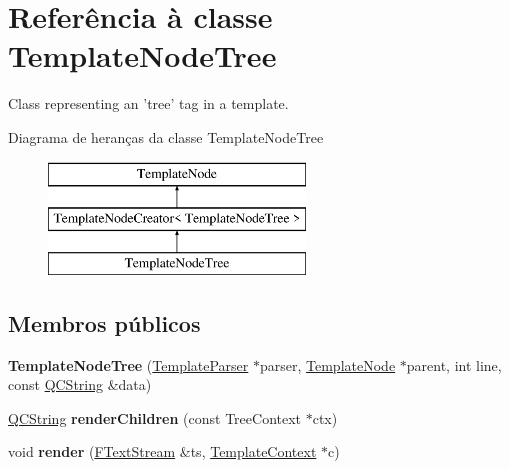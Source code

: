 \hypertarget{class_template_node_tree}{\section{Referência à classe Template\-Node\-Tree}
\label{class_template_node_tree}
}


Class representing an 'tree' tag in a template.  


Diagrama de heranças da classe Template\-Node\-Tree\begin{figure}[H]
\begin{center}
\leavevmode
\includegraphics[height=3.000000cm]{class_template_node_tree}
\end{center}
\end{figure}
\subsection*{Membros públicos}
\begin{DoxyCompactItemize}
\item 
\hypertarget{class_template_node_tree_a28053a15262b3c8b2d82c498468b90e7}{{\bfseries Template\-Node\-Tree} (\hyperlink{class_template_parser}{Template\-Parser} $\ast$parser, \hyperlink{class_template_node}{Template\-Node} $\ast$parent, int line, const \hyperlink{class_q_c_string}{Q\-C\-String} \&data)}\label{class_template_node_tree_a28053a15262b3c8b2d82c498468b90e7}

\item 
\hypertarget{class_template_node_tree_a6094f9b8b29494bd3ddd82cf6a0bbec1}{\hyperlink{class_q_c_string}{Q\-C\-String} {\bfseries render\-Children} (const Tree\-Context $\ast$ctx)}\label{class_template_node_tree_a6094f9b8b29494bd3ddd82cf6a0bbec1}

\item 
\hypertarget{class_template_node_tree_aaa6575d8c79eeaa49f849f1ca1d6b228}{void {\bfseries render} (\hyperlink{class_f_text_stream}{F\-Text\-Stream} \&ts, \hyperlink{class_template_context}{Template\-Context} $\ast$c)}\label{class_template_node_tree_aaa6575d8c79eeaa49f849f1ca1d6b228}

\end{DoxyCompactItemize}
